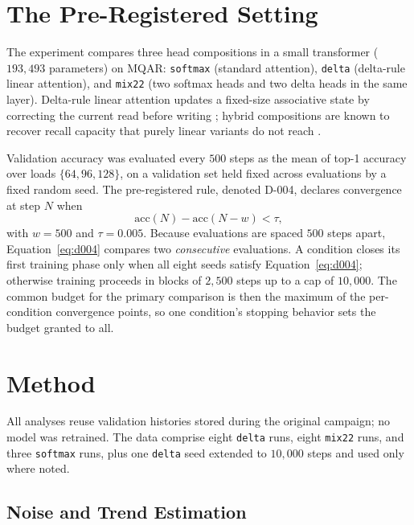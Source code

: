 \documentclass[jou,11pt,donotrepeattitle]{apa7}
\begin{document}
\section{The Pre-Registered Setting}

The experiment compares three head compositions in a small transformer ($193{,}493$ parameters)
on MQAR: \texttt{softmax} (standard attention), \texttt{delta} (delta-rule linear attention),
and \texttt{mix22} (two softmax heads and two delta heads in the same layer). Delta-rule linear
attention updates a fixed-size associative state by correcting the current read before writing
\parencite{yang2024gated}; hybrid compositions are known to recover recall capacity that purely
linear variants do not reach \parencite{arora2023zoology,arora2024simple}.

Validation accuracy was evaluated every $500$ steps as the mean of top-1 accuracy over loads
$\{64, 96, 128\}$, on a validation set held fixed across evaluations by a fixed random seed. The
pre-registered rule, denoted D-004, declares convergence at step $N$ when
%
\begin{equation}
\mathrm{acc}(N) - \mathrm{acc}(N - w) < \tau ,
\label{eq:d004}
\end{equation}
%
with $w = 500$ and $\tau = 0.005$. Because evaluations are spaced $500$ steps apart,
Equation~\ref{eq:d004} compares two \emph{consecutive} evaluations. A condition closes its first
training phase only when all eight seeds satisfy Equation~\ref{eq:d004}; otherwise training
proceeds in blocks of $2{,}500$ steps up to a cap of $10{,}000$. The common budget for the
primary comparison is then the maximum of the per-condition convergence points, so one
condition's stopping behavior sets the budget granted to all.

\section{Method}

All analyses reuse validation histories stored during the original campaign; no model was
retrained. The data comprise eight \texttt{delta} runs, eight \texttt{mix22} runs, and three
\texttt{softmax} runs, plus one \texttt{delta} seed extended to $10{,}000$ steps and used only
where noted.

\subsection{Noise and Trend Estimation}
\end{document}
